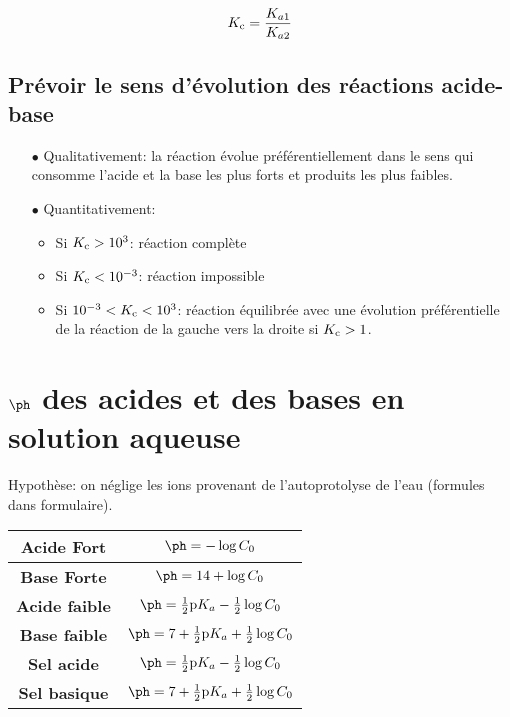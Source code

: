 $$K_{\mathrm{c}}=\frac{K_{a1}}{K_{a2}}$$

\subsection{Prévoir le sens d'évolution des réactions acide-base}

\begin{itemize}
  \item[$\bullet$] Qualitativement: la réaction évolue préférentiellement dans le sens qui consomme l'acide et la base les plus forts et produits les plus faibles.
  \item[$\bullet$] Quantitativement:
    \begin{itemize}
      \item Si $K_{\mathrm{c}}>10^3$: réaction complète
      \item Si $K_{\mathrm{c}}<10^{-3}$: réaction impossible
      \item Si $10^{-3}<K_{\mathrm{c}}<10^3$: réaction équilibrée avec une évolution
        préférentielle de la réaction de la gauche vers la droite si $K_{\mathrm{c}}>1$.
    \end{itemize}
\end{itemize}

\section{$\ph$ des acides et des bases en solution aqueuse}

Hypothèse: on néglige les ions  provenant de
l'autoprotolyse de l'eau (formules dans formulaire).

\begin{center}
  \renewcommand{\arraystretch}{1.5}
  \begin{tabular}{|>{\bf}c|c|}
    \hline
    Acide Fort & $\ph=-\log{C_0}$ \\
    \hline
    Base Forte & $\ph=14+\log{C_0}$ \\
    \hline
    Acide faible & $\ph=\frac{1}{2}\pka-\frac{1}{2}\log{C_0}$ \\
    \hline
    Base faible & $\ph=7+\frac{1}{2}\pka+\frac{1}{2}\log{C_0}$ \\
    \hline
    Sel acide & $\ph=\frac{1}{2}\pka-\frac{1}{2}\log{C_0}$ \\
    \hline
    Sel basique & $\ph=7+\frac{1}{2}\pka+\frac{1}{2}\log{C_0}$ \\
    \hline
  \end{tabular}
\end{center}

